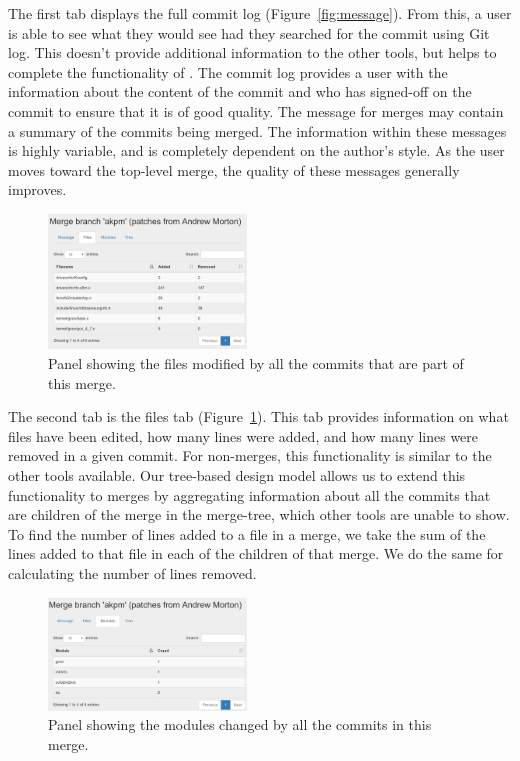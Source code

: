 \documentclass[conference, draftclsnofoot, draft]{IEEEtran}
\begin{document}
The first tab displays the full commit log (Figure~\ref{fig:message}). From this, a
user is able to see what they would see had they searched for the commit using Git
log. This doesn't provide additional information to the other tools, but helps to
complete the functionality of \tool. The commit log provides a user with the
information about the content of the commit and who has signed-off on the commit to
ensure that it is of good quality. The message for merges may contain a summary of
the commits being merged.  The information within these messages is highly variable,
and is completely dependent on the author's style. As the user moves toward the
top-level merge, the quality of these messages generally improves.

\begin{figure}
        \centering
        \includegraphics[width=0.47\textwidth]{figures/files_view_2.png}
        \caption{Panel showing the files modified by all the commits that are part
                of this merge.}
        \label{fig:files}
\end{figure}

The second tab is the files tab (Figure~\ref{fig:files}). This tab provides
information on what files have been edited, how many lines were added, and how many
lines were removed in a given commit. For non-merges, this functionality is similar
to the other tools available. Our tree-based design model allows us to extend this
functionality to merges by aggregating information about all the commits that are
children of the merge in the merge-tree, which other tools are unable to show. To
find the number of lines added to a file in a merge, we take the sum of the lines
added to that file in each of the children of that merge. We do the same for
calculating the number of lines removed.



\begin{figure}
        \centering
        \includegraphics[width=0.47\textwidth]{figures/modules_view_2.png}
        \caption{Panel showing the modules changed by all the commits in this merge.}
        \label{fig:modules}
\end{figure}
\end{document}
